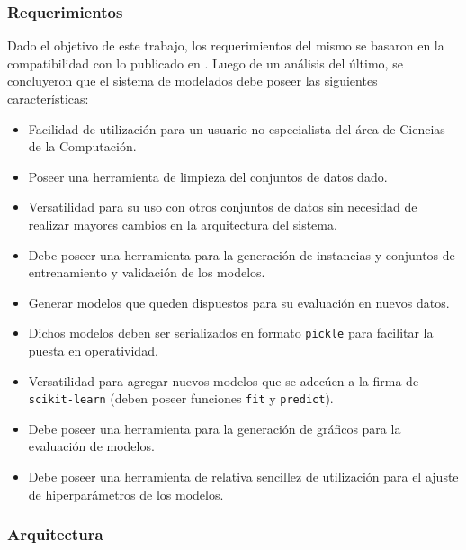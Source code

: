       \subsubsection{Requerimientos}
        \par Dado el objetivo de este trabajo, los requerimientos del mismo se
        basaron en la compatibilidad con lo publicado en \cite{porcasi_operative}.
        Luego de un análisis del último, se concluyeron que el sistema de
        modelados debe poseer las siguientes características:
        \begin{itemize}
          \item Facilidad de utilización para un usuario no especialista del área de
            Ciencias de la Computación.

          \item Poseer una herramienta de limpieza del conjuntos de datos
            dado.

          \item Versatilidad para su uso con otros conjuntos de datos sin necesidad
            de realizar mayores cambios en la arquitectura del sistema.

          \item Debe poseer una herramienta para la generación de instancias y
            conjuntos de entrenamiento y validación de los modelos.

          \item Generar modelos que queden dispuestos para su evaluación en
            nuevos datos.

          \item Dichos modelos deben ser serializados en formato \verb|pickle|
            para facilitar la puesta en operatividad.

          \item Versatilidad para agregar nuevos modelos que se adecúen a la
            firma de \verb|scikit-learn| (deben poseer funciones \verb|fit| y
            \verb|predict|).

          \item Debe poseer una herramienta para la generación de gráficos
            para la evaluación de modelos.

          \item Debe poseer una herramienta de relativa sencillez de utilización
            para el ajuste de hiperparámetros de los modelos.
        \end{itemize}


      \subsubsection{Arquitectura}



